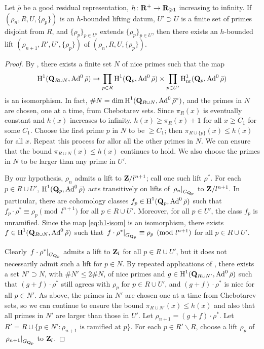 \begin{theorem}\label{thm:lifting-datum}
Let $\bar\rho$ be a good residual representation, 
$h\colon \mathbf{R}^+ \to \mathbf{R}_{\geqslant 1}$ 
increasing to infinity. If $(\rho_n,R,U,\{\rho_p\})$ is an $h$-bounded lifting 
datum, $U'\supset U$ is a finite set of primes disjoint from $R$, and 
$\{\rho_p\}_{p\in U'}$ extends $\{\rho_p\}_{p\in U}$, then there exists an 
$h$-bounded lift $(\rho_{n+1},R',U',\{\rho_p\})$ of 
$(\rho_n,R,U,\{\rho_p\})$. 
\end{theorem}
\begin{proof}
By \cite[Lem.~8]{khare-larsen-ramakrishna-2005}, there exists a finite set 
$N$ of nice primes such that the map 
\begin{equation}\label{eq:h1-isom}
	\operatorname{H}^1(\mathbf{Q}_{R\cup N},\operatorname{Ad}^0\bar\rho) \to \prod_{p\in R} \operatorname{H}^1(\mathbf{Q}_p,\operatorname{Ad}^0\bar\rho) \times \prod_{p\in U'} \operatorname{H}_{\mathrm{nr}}^1(\mathbf{Q}_p,\operatorname{Ad}^0\bar\rho) 
\end{equation}
is an isomorphism. In fact, 
$\# N = \dim\operatorname{H}^1(\mathbf{Q}_{R\cup N},\operatorname{Ad}^0\bar\rho^\ast)$, and the primes in $N$ are 
chosen, one at a time, from Chebotarev sets. Since $\pi_R(x)$ is eventually 
constant and $h(x)$ increases to infinity, $h(x) \geqslant \pi_R(x)+1$ for all 
$x\geqslant C_1$ for some $C_1$. Choose the first prime $p$ in $N$ to be 
$\geqslant C_1$; then $\pi_{R\cup\{p\}}(x) \leqslant h(x)$ for all $x$. Repeat 
this process for allor all the other primes in $N$. We can ensure 
that the bound $\pi_{R\cup N}(x) \leqslant h(x)$ continues to hold. We also 
choose the primes in $N$ to be larger than any prime in $U'$. 

By our hypothesis, $\rho_n$ admits a lift to $\mathbf{Z}/l^{n+1}$; call one such lift 
$\rho^\ast$. For each $p\in R\cup U'$, $\operatorname{H}^1(\mathbf{Q}_p,\operatorname{Ad}^0\bar\rho)$ acts 
transitively on lifts of $\left.\rho_n\right|_{G_{\mathbf{Q}_p}}$ to $\mathbf{Z}/l^{n+1}$. In 
particular, there are cohomology classes $f_p\in \operatorname{H}^1(\mathbf{Q}_p,\operatorname{Ad}^0\bar\rho)$ 
such that $f_p\cdot \rho^\ast \equiv \rho_p\pmod{l^{n+1}}$ for all 
$p\in R\cup U'$. Moreover, for all $p\in U'$, the class $f_p$ is unramified. 
Since the map \eqref{eq:h1-isom} is an isomorphism, there exists 
$f\in \operatorname{H}^1(\mathbf{Q}_{R\cup N},\operatorname{Ad}^0\bar\rho)$ such that 
$\left.f\cdot \rho^\ast\right|_{G_{\mathbf{Q}_p}}\equiv \rho_p\pmod{l^{n+1}}$ for all 
$p\in R\cup U'$. 

Clearly $\left. f\cdot \rho^\ast\right|_{G_{\mathbf{Q}_p}}$ admits a lift to $\mathbf{Z}_l$ 
for all $p\in R\cup U'$, but it does not necessarily admit such a lift for 
$p\in N$. By repeated applications of \cite[Prop.~3.10]{pande-2011}, there 
exists a set $N'\supset N$, with $\# N'\leqslant 2\# N$, of nice primes and 
$g\in \operatorname{H}^1(\mathbf{Q}_{R\cup N'},\operatorname{Ad}^0\bar\rho)$ such that 
$(g+f)\cdot \rho^\ast$ still agrees with $\rho_p$ for $p\in R\cup U'$, and 
$(g+f)\cdot \rho^\ast$ is nice for all $p\in N'$. As above, the primes in $N'$ 
are chosen one at a time from Chebotarev sets, so we can continue to ensure the 
bound $\pi_{R\cup N'}(x)\leqslant h(x)$ and also that all primes in $N'$ 
are larger than those in $U'$. Let $\rho_{n+1} = (g+f) \cdot \rho^\ast$. Let 
$R' = R\cup \{p\in N' : \rho_{n+1}\text{ is ramified at }p\}$. For each 
$p\in R'\smallsetminus R$, choose a lift $\rho_p$ of 
$\left. \rho_{n+1}\right|_{G_{\mathbf{Q}_p}}$ to $\mathbf{Z}_l$. 


\end{proof}

